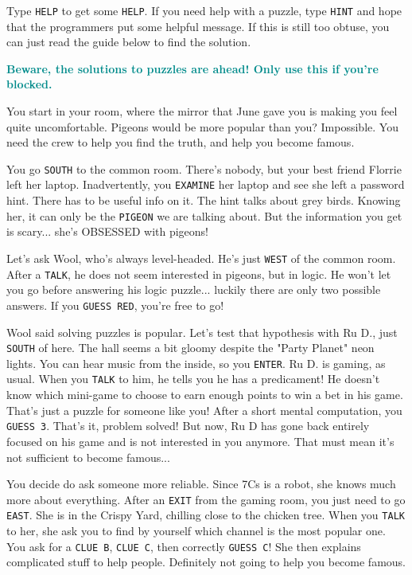 \documentclass{article}
\newcommand{\bo}[1] {\textbf{#1}}
\newcommand{\bblu}[1] {\textbf{\textcolor{darkcyan}{#1}}}
\newcommand{\bckg}[1]{\AddToShipoutPictureBG*{\texttt{[image: \#1]}}}
\begin{document}
Type \texttt{HELP} to get some \texttt{HELP}.
If you need help with a puzzle, type \texttt{HINT} and hope that the programmers put some helpful message.
If this is still too obtuse, you can just read the guide below to find the solution.

\clearpage

\clearpage
{}
\bckg{img/bg}

\bblu{\bo{Beware, the solutions to puzzles are ahead! Only use this if you're blocked.}}

You start in your room, where the mirror that June gave you is making you feel quite uncomfortable.
Pigeons would be more popular than you? Impossible.
You need the crew to help you find the truth, and help you become famous.

You go \texttt{SOUTH} to the common room.
There's nobody, but your best friend Florrie left her laptop.
Inadvertently, you \texttt{EXAMINE} her laptop and see she left a password hint.
There has to be useful info on it. The hint talks about grey birds.
Knowing her, it can only be the \texttt{PIGEON} we are talking about.
But the information you get is scary... she's OBSESSED with pigeons!

Let's ask Wool, who's always level-headed. He's just \texttt{WEST} of the common room.
After a \texttt{TALK}, he does not seem interested in pigeons, but in logic.
He won't let you go before answering his logic puzzle... luckily there are only two possible answers.
If you \texttt{GUESS RED}, you're free to go!

Wool said solving puzzles is popular.
Let's test that hypothesis with Ru D., just \texttt{SOUTH} of here.
The hall seems a bit gloomy despite the "Party Planet" neon lights.
You can hear music from the inside, so you \texttt{ENTER}.
Ru D. is gaming, as usual. When you \texttt{TALK} to him, he tells you he has a predicament!
He doesn't know which mini-game to choose to earn enough points to win a bet in his game.
That's just a puzzle for someone like you!
After a short mental computation, you \texttt{GUESS 3}. That's it, problem solved!
But now, Ru D has gone back entirely focused on his game and is not interested in you anymore.
That must mean it's not sufficient to become famous...

You decide do ask someone more reliable.
Since 7Cs is a robot, she knows much more about everything.
After an \texttt{EXIT} from the gaming room, you just need to go \texttt{EAST}.
She is in the Crispy Yard, chilling close to the chicken tree.
When you \texttt{TALK} to her, she ask you to find by yourself which channel is the most popular one.
You ask for a \texttt{CLUE B}, \texttt{CLUE C}, then correctly \texttt{GUESS C}!
She then explains complicated stuff to help people.
Definitely not going to help you become famous.
\end{document}
